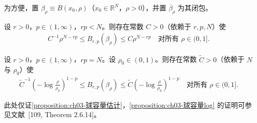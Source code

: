 \documentclass[../../main.tex]{subfiles}%
\begin{document}
为方便，置 $\beta_\rho\equiv B(x_0,\rho)$（$x_0\in\mathbb{R}^N$，$\rho>0$），并置 $\overline{\beta}_\rho$ 为其闭包。

\begin{proposition}\label{proposition:ch03-球容量估计}
设 $r>0$，$p\in(1,\infty)$，$rp<N$。则存在常数 $C>0$（依赖于 $r,p,N$）使
\begin{align}
C^{-1}\rho^{N-rp}\leqslant B_{r,p}(\beta_\rho)\leqslant C\rho^{N-rp}
\quad \text{对所有 }\rho\in(0,1].\label{align:ch03-3.52a}
\end{align}
\end{proposition}

\begin{proposition}\label{proposition:ch03-球容量log}
设 $r>0$，$p\in(1,\infty)$，$rp=N$。设 $\rho_0\in(0,1)$。则存在常数 $\widetilde C>0$（依赖于 $N$ 与 $\rho_0$）使
\begin{align}
\widetilde C^{-1}\left(-\log\frac{\rho}{\rho_0}\right)^{1-p}
\leqslant B_{r,p}(\beta_\rho)
\leqslant\widetilde C\left(-\log\frac{\rho}{\rho_0}\right)^{1-p}
\quad \text{对所有 }\rho\in(0,1].\label{align:ch03-3.52b}
\end{align}
\end{proposition}

此处仅证\cref{proposition:ch03-球容量估计}，\cref{proposition:ch03-球容量log} 的证明可参见文献~[109, Theorem 2.6.14]。
\end{document}
